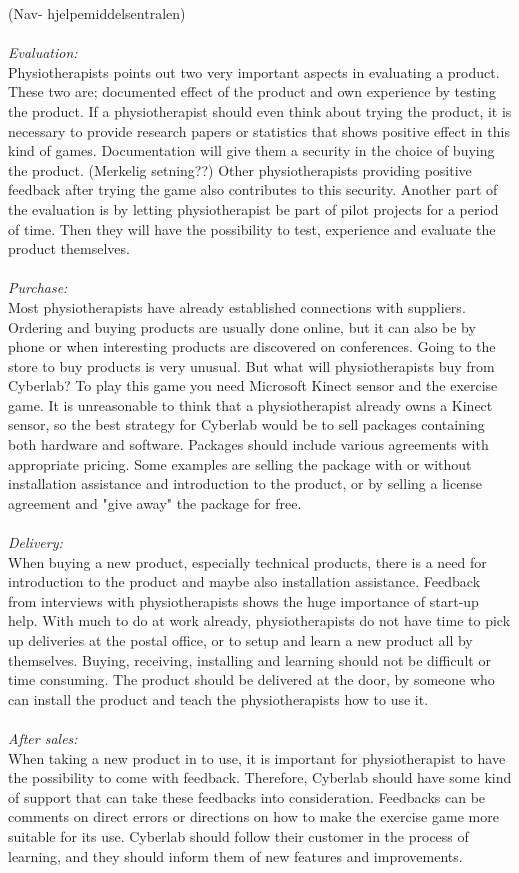 (Nav- hjelpemiddelsentralen)\\ \\
\emph{Evaluation:}\\
Physiotherapists points out two very important aspects in evaluating a product. These two are; documented effect of the product and own experience by testing the product. If a physiotherapist should even think about trying the product, it is necessary to provide research papers or statistics that shows positive effect in this kind of games. Documentation will give them a security in the choice of buying the product. (Merkelig setning??) Other physiotherapists providing positive feedback after trying the game also contributes to this security. Another part of the evaluation is by letting physiotherapist be part of pilot projects for a period of time. Then they will have the possibility to test, experience and evaluate the product themselves.\\ \\
\emph{Purchase:} \\
Most physiotherapists have already established connections with suppliers. Ordering and buying products are usually done online, but it can also be by phone or when interesting products are discovered on conferences. Going to the store to buy products is very unusual. But what will physiotherapists buy from Cyberlab? To play this game you need Microsoft Kinect sensor and the exercise game. It is unreasonable to think that a physiotherapist already owns a Kinect sensor, so the best strategy for Cyberlab would be to sell packages containing both hardware and software.  Packages should include various agreements with appropriate pricing. Some examples are selling the package with or without installation assistance and introduction to the product, or by selling a license agreement and "give away" the package for free.\\ \\
\emph{Delivery:}\\
When buying a new product, especially technical products, there is a need for introduction to the product and maybe also installation assistance. Feedback from interviews with physiotherapists shows the huge importance of start-up help. With much to do at work already, physiotherapists do not have time to pick up deliveries at the postal office, or to setup and learn a new product all by themselves. Buying, receiving, installing and learning should not be difficult or time consuming. The product should be delivered at the door, by someone who can install the product and teach the physiotherapists how to use it.\\ \\
\emph{After sales:}\\
When taking a new product in to use, it is important for physiotherapist to have the possibility to come with feedback. Therefore, Cyberlab should have some kind of support that can take these feedbacks into consideration. Feedbacks can be comments on direct errors or directions on how to make the exercise game more suitable for its use. Cyberlab should follow their customer in the process of learning, and they should inform them of new features and improvements.  
